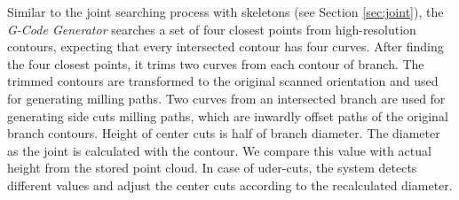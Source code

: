 Similar to the joint searching process with skeletons (see Section \ref{sec:joint}), the \textit{G-Code Generator} searches a set of four closest points from high-resolution contours, expecting that every intersected contour has four curves.
After finding the four closest points, it trims two curves from each contour of branch. 
The trimmed contours are transformed to the original scanned orientation and used for generating milling paths.
Two curves from an intersected branch are used for generating side cuts milling paths, which are inwardly offset paths of the original branch contours.
Height of center cuts is half of branch diameter.
The diameter as the joint is calculated with the contour.
We compare this value with actual height from the stored point cloud.
In case of uder-cuts, the system detects different values and adjust the center cuts according to the recalculated diameter.


